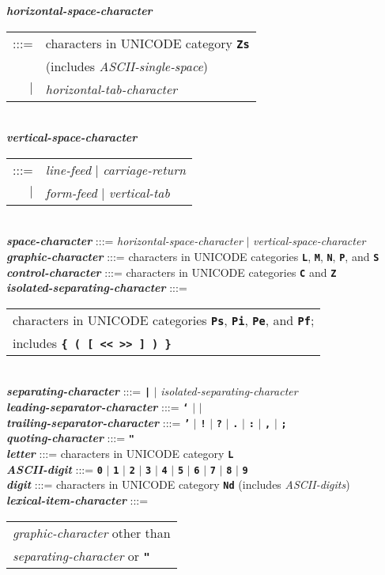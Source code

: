 \documentclass[12pt]{article}
\newcommand{\TT}[1]{{\tt \bfseries #1}}
\newcommand{\emkey}[1]{{\em \bfseries #1}}
\newenvironment{indpar}[1][0.3in]%
	{\begin{list}{}%
		     {\setlength{\itemsep}{0in}%
		      \setlength{\topsep}{0in}%
		      \setlength{\parsep}{1ex}%
		      \setlength{\labelwidth}{#1}%
		      \setlength{\leftmargin}{#1}%
		      \addtolength{\leftmargin}{\labelsep}}%
	 \item}%
	{\end{list}}
\begin{document}
\begin{indpar}
\emkey{horizontal-space-character}
    \begin{tabular}[t]{rl}
    :::= & characters in UNICODE category \TT{Zs} \\
         & (includes {\em ASCII-single-space}) \\
    $|$  & {\em horizontal-tab-character}
    \end{tabular}
\\
\emkey{vertical-space-character}
    \begin{tabular}[t]{rl}
    :::= & {\em line-feed} $|$ {\em carriage-return} \\
    $|$ & {\em form-feed} $|$ {\em vertical-tab}
    \end{tabular}
\\
\emkey{space-character} :::= {\em horizontal-space-character}
                        $|$ {\em vertical-space-character}
\\[1ex]
\emkey{graphic-character} :::= characters in UNICODE categories
                              \TT{L}, \TT{M}, \TT{N}, \TT{P}, and \TT{S}
\\
\emkey{control-character} :::=
	characters in UNICODE categories \TT{C} and \TT{Z}
\\[1ex]
\emkey{isolated-separating-character} :::= \\
\hspace*{0.5in}
    \begin{tabular}[t]{l}
    characters in UNICODE categories \TT{Ps}, \TT{Pi}, \TT{Pe},
    and \TT{Pf}; \\
    includes \TT{\{ ( [ << >> ] ) \}}
    \end{tabular}
\\
\emkey{separating-character} :::= \TT{|} $|$ {\em isolated-separating-character}
\\[1ex]
\emkey{leading-separator-character} :::=
	\TT{`} $|$ \TT{\textexclamdown} $|$ \TT{\textquestiondown}
\\
\emkey{trailing-separator-character} :::=
	\TT{'} $|$ \TT{!} $|$ \TT{?} $|$ \TT{.} $|$ \TT{:}
	       $|$ \TT{,} $|$ \TT{;}
\\[1ex]
\emkey{quoting-character} :::= \TT{"}
\\[1ex]
\emkey{letter} :::=
    characters in UNICODE category \TT{L}
\\
\emkey{ASCII-digit} :::= \TT{0} $|$ \TT{1} $|$ \TT{2} $|$ \TT{3} $|$ \TT{4}
                     $|$ \TT{5} $|$ \TT{6} $|$ \TT{7} $|$ \TT{8} $|$ \TT{9}
\\
\emkey{digit} :::=
    characters in UNICODE category \TT{Nd}
    (includes {\em ASCII-digits})
\\
\emkey{lexical-item-character} :::=
	\begin{tabular}[t]{l}
        {\em graphic-character} other than \\
	{\em separating-character} or \TT{"}
	\end{tabular}
\end{indpar}
\end{document}
